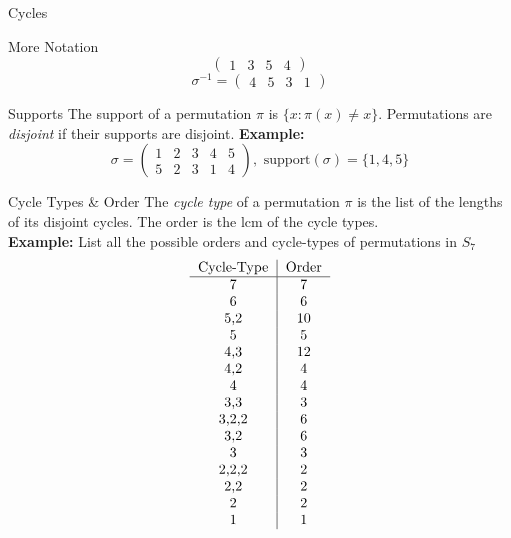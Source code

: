 \documentclass{article}
\begin{document}
\begin{multicols*}{3}
\begin{blackbox}{Cycles}
\begin{brownbox}{More Notation}
\[\begin{pmatrix}
            1 & 3 & 5 & 4
        \end{pmatrix}\]
        \[\sigma^{-1} = \begin{pmatrix}
            4 & 5 & 3 & 1
        \end{pmatrix}\]
    \end{brownbox}
    \begin{pinkbox}{Supports}
        The support of a permutation $\pi$ is $\{x: \pi(x) \neq x\}$. Permutations are \emph{disjoint} if their supports are disjoint. 
        \textbf{Example:}\\[-2ex]
        \[\sigma = \begin{pmatrix}
            1 & 2 & 3 & 4 & 5 \\
            5 & 2  & 3 & 1 & 4
        \end{pmatrix}, \text{ support}(\sigma) = \{1,4,5\}\]
    \end{pinkbox}
    \begin{redbox}{Cycle Types \& Order}
        The \emph{cycle type} of a permutation $\pi$ is the list of the lengths of its disjoint cycles. The order is the lcm of the cycle types.  \\
        \textbf{Example:} List all the possible orders and cycle-types of permutations in $S_7$\\[-2ex]
        \[\begin{tabular}{c|c}
              Cycle-Type & Order \\
              \hline
              7 & 7\\
              6 & 6\\
              5,2 & 10\\
              5 & 5\\
              4,3 & 12\\
              4,2 & 4\\
              4 & 4\\
              3,3 & 3\\
              3,2,2 & 6\\
              3,2 & 6\\
              3 & 3\\
              2,2,2 & 2\\
              2,2 & 2\\
              2 & 2 \\
              1 & 1\\
        \end{tabular}\]
    \end{redbox}\\[-2ex]

\end{blackbox}
\end{multicols*}
\end{document}
